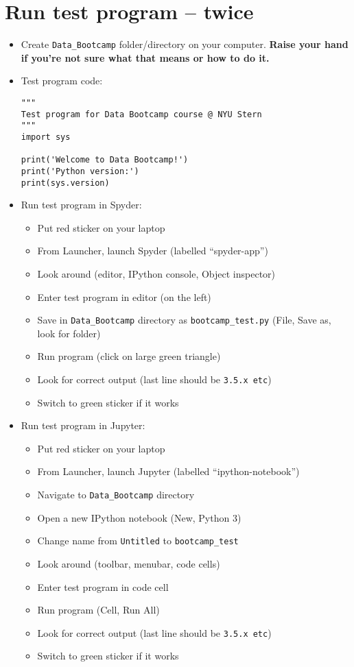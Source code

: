 \documentclass[11pt]{article}
\begin{document}
\section*{Run test program -- twice}

\begin{itemize} 
\item Create \verb|Data_Bootcamp| folder/directory on your computer.
{\bf Raise your hand if you're not sure what that means or how to do it.}

\item Test program code:

\vspace{-0.1in}
\begin{verbatim}
"""
Test program for Data Bootcamp course @ NYU Stern 
"""
import sys  

print('Welcome to Data Bootcamp!')
print('Python version:')
print(sys.version)
\end{verbatim} 

\item Run test program in Spyder:  
\begin{itemize}
\item Put red sticker on your laptop 
\item From Launcher, launch Spyder (labelled ``spyder-app'') 
\item Look around (editor, IPython console, Object inspector) 
\item Enter test program in editor (on the left)
\item Save in \verb|Data_Bootcamp| directory as \verb|bootcamp_test.py| 
(File, Save as, look for folder)
\item Run program (click on large green triangle) 
\item Look for correct output (last line should be {\tt 3.5.x etc}) 
\item Switch to green sticker if it works 
\end{itemize} 

\item Run test program in Jupyter:
\begin{itemize}
\item Put red sticker on your laptop
\item From Launcher, launch Jupyter (labelled ``ipython-notebook'')
\item Navigate to \verb|Data_Bootcamp| directory
\item Open a new IPython notebook (New, Python 3)
\item Change name from {\tt Untitled} to \verb|bootcamp_test|
\item Look around (toolbar, menubar, code cells)
\item Enter test program in code cell 
\item Run program (Cell, Run All) 
\item Look for correct output (last line should be {\tt 3.5.x etc})
\item Switch to green sticker if it works
\end{itemize}
\end{itemize} 
\end{document}

